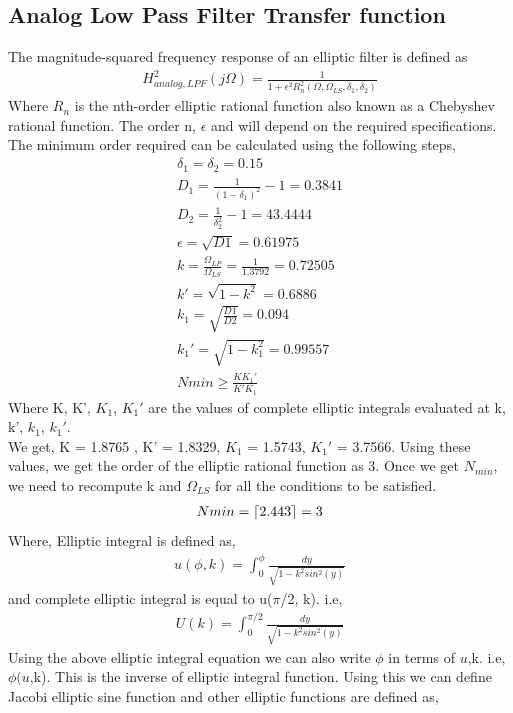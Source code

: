 \documentclass[12pt]{article}
\begin{document}
\subsection{Analog Low Pass Filter Transfer function}
\color{black}
The magnitude-squared frequency response of an elliptic filter is defined as
\begin{gather*}
	H_{analog,LPF}^2(j\Omega) = \frac{1}{1+\epsilon^2R_{n}^2(\Omega, \Omega_{LS}, \delta_1, \delta_2)}
\end{gather*}
Where $R_n$ is the nth-order elliptic rational function also known as a Chebyshev rational function. The order n, $\epsilon$ and will depend on the required specifications.
The minimum order required can be calculated using the following steps,
\begin{gather*}
	\delta_1 = \delta_2 = 0.15\\
	D_1 = \frac{1}{(1-\delta_1)^2} - 1 = 0.3841\\
	D_2 = \frac{1}{\delta_2^2} - 1 = 43.4444\\
	\epsilon = \sqrt{D1} = 0.61975\\
	k = \frac{\Omega_{LP}}{\Omega_{LS}} =  \frac{1}{1.3792} = 0.72505\\
	k' = \sqrt{1-k^2} = 0.6886\\
	k_1 = \sqrt{\frac{D1}{D2}} = 0.094\\
	k_1' = \sqrt{1-k_1^2} = 0.99557\\
	Nmin \ge \frac{KK_1'}{K'K_1}
\end{gather*}
Where K, K', $K_1$, $K_1'$ are the values of complete elliptic integrals evaluated at k, k', $k_1$, $k_1'$.\\
We get, K = 1.8765 , K' = 1.8329, $K_1$ = 1.5743, $K_1'$ = 3.7566. Using these values, we get the order of the elliptic rational function as 3. Once we get $N_{min}$, we need to recompute k and $\Omega_{LS}$ for all the conditions to be satisfied.
\begin{gather*}
	Nmin = \ceil{2.443} = 3 
\end{gather*}
Where, Elliptic integral is defined as,
\begin{gather*}
	u(\phi,k) = \int_{0}^{\phi} \frac{dy}{\sqrt{1-k^2sin^2(y)}}
\end{gather*} 
and complete elliptic integral is equal to u($\pi$/2, k). i.e,
\begin{gather*}
	U(k) = \int_{0}^{\pi/2} \frac{dy}{\sqrt{1-k^2sin^2(y)}}
\end{gather*}
Using the above elliptic integral equation we can also write $\phi$ in terms of $u$,k. i.e, $\phi(u$,k). This is the inverse of elliptic integral function. Using this we can define Jacobi elliptic sine function and other elliptic functions are defined as,
\end{document}
